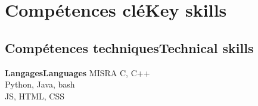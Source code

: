 \vspace{-1.3cm}

\ifnativelang
\newcommand{\CVheader}{6 ann\'ees d'exp\'erience en syst\`emes embarqu\'es critiques et r\'eseaux.}%
\else
\newcommand{\CVheader}{6+ years of experience in Real-Time systems, embedded linux and networking.\\
Experience in project steering and team management.}
\fi


\section{\ifnativelang Comp\'etences cl\'e\else Key skills\fi}

\ifaddmngt
\subsection{\ifnativelang Comp\'etences techniques\else Technical skills\fi}
\fi

\cvcomputer{
\textbf{\ifnativelang Syst\`emes embarqu\'es\else Embedded systems \fi}}{
\begin{itemize}
\item \ifnativelang OSs temps-r\'eel \else Real-time OSs \fi : Keil CMSIS, Contiki %
\item \ifnativelang Linux embarqu\'e : Buildroot, Busybox\else Embedded Linux : U-boot, Busybox \fi
\item \ifnativelang Bus de communication \& drivers \else Communication busses and drivers\fi
\end{itemize}
}
{\ifnativelang\textbf{Langages}\else \textbf{Languages}\fi}{
 MISRA C, C++ \\%
 Python, Java, bash\\
 JS, HTML, CSS
}

